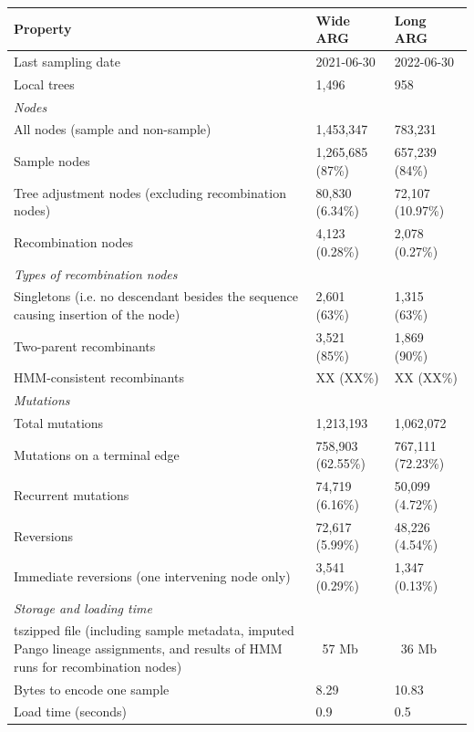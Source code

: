 \documentclass{article}
\begin{document}
\begin{table}
\centering
\begin{tabular}{l|l|l}
\hline
\textbf{Property} & \textbf{Wide ARG} & \textbf{Long ARG} \\
\hline
Last sampling date & 2021-06-30 & 2022-06-30 \\
Local trees & 1,496 & 958 \\
\hline
\multicolumn{3}{l}{\textit{Nodes}} \\
All nodes (sample and non-sample) & 1,453,347 & 783,231 \\
Sample nodes & 1,265,685 (87\%) & 657,239 (84\%) \\
Tree adjustment nodes (excluding recombination nodes) & 80,830 (6.34\%) & 72,107 (10.97\%) \\
Recombination nodes & 4,123 (0.28\%) & 2,078 (0.27\%) \\
\hline
\multicolumn{3}{l}{\textit{Types of recombination nodes}} \\
Singletons (i.e. no descendant besides the sequence causing insertion of the node) & 2,601 (63\%) & 1,315 (63\%) \\
Two-parent recombinants & 3,521 (85\%) & 1,869 (90\%) \\
HMM-consistent recombinants & XX (XX\%) & XX (XX\%) \\
\hline
\multicolumn{3}{l}{\textit{Mutations}} \\
Total mutations & 1,213,193 & 1,062,072 \\
Mutations on a terminal edge & 758,903 (62.55\%) & 767,111 (72.23\%) \\
Recurrent mutations & 74,719 (6.16\%) & 50,099 (4.72\%) \\
Reversions & 72,617 (5.99\%) & 48,226 (4.54\%) \\
Immediate reversions (one intervening node only) & 3,541 (0.29\%) & 1,347 (0.13\%) \\
\hline
\multicolumn{3}{l}{\textit{Storage and loading time}} \\
tszipped file (including sample metadata, imputed Pango lineage assignments, and results of HMM runs for recombination nodes) & ~57 Mb & ~36 Mb \\
Bytes to encode one sample & 8.29 & 10.83 \\
Load time (seconds) & 0.9 & 0.5 \\
\hline
\end{tabular}
\end{table}
\end{document}
